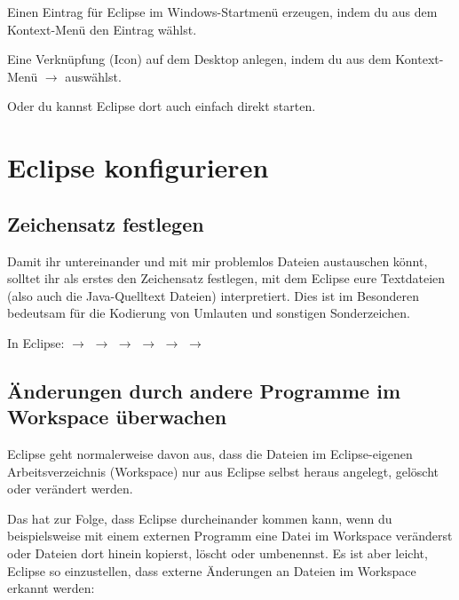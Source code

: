 \begin{compactitem}

\item Einen Eintrag für Eclipse im Windows-Startmenü erzeugen, indem du aus dem
Kontext-Menü den Eintrag  wählst.

\item Eine Verknüpfung (Icon) auf dem Desktop anlegen, indem du aus dem
Kontext-Menü  $\rightarrow$  auswählst.

\end{compactitem}

Oder du kannst Eclipse dort auch einfach direkt starten.

\section{Eclipse konfigurieren}

\subsection{Zeichensatz festlegen}

Damit ihr untereinander und mit mir problemlos Dateien austauschen könnt,
solltet ihr als erstes den Zeichensatz festlegen, mit dem Eclipse eure
Textdateien (also auch die Java-Quelltext Dateien) interpretiert. Dies ist im
Besonderen bedeutsam für die Kodierung von Umlauten und sonstigen
Sonderzeichen.

In Eclipse:  $\rightarrow$  $\rightarrow$
 $\rightarrow$  $\rightarrow$  $\rightarrow$  $\rightarrow$ 

\subsection{Änderungen durch andere Programme im Workspace überwachen}

Eclipse geht normalerweise davon aus, dass die Dateien im Eclipse-eigenen
Arbeitsverzeichnis (Workspace) nur aus Eclipse selbst heraus angelegt, gelöscht
oder verändert werden.

Das hat zur Folge, dass Eclipse durcheinander kommen kann, wenn du
beispielsweise mit einem externen Programm eine Datei im Workspace veränderst
oder Dateien dort hinein kopierst, löscht oder umbenennst.
Es ist aber leicht, Eclipse so einzustellen, dass externe Änderungen an Dateien
im Workspace erkannt werden:

